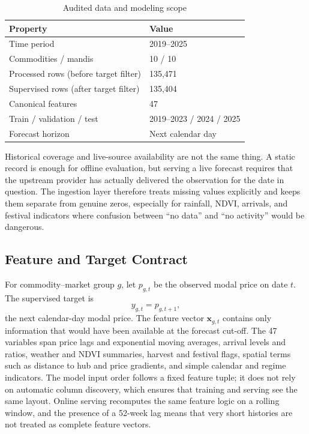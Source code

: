 \documentclass[a4paper,conference]{IEEEtran}
\begin{document}
\begin{table}[t]
\caption{Audited data and modeling scope}
\label{tab:data}
\centering
\small
\begin{tabular}{@{}ll@{}}
\toprule
Property & Value \\
\midrule
Time period & 2019--2025 \\
Commodities / mandis & 10 / 10 \\
Processed rows (before target filter) & 135{,}471 \\
Supervised rows (after target filter) & 135{,}404 \\
Canonical features & 47 \\
Train / validation / test & 2019--2023 / 2024 / 2025 \\
Forecast horizon & Next calendar day \\
\bottomrule
\end{tabular}
\end{table}

Historical coverage and live-source availability are not the same thing. A static record is enough for offline evaluation, but serving a live forecast requires that the upstream provider has actually delivered the observation for the date in question. The ingestion layer therefore treats missing values explicitly and keeps them separate from genuine zeros, especially for rainfall, NDVI, arrivals, and festival indicators where confusion between “no data” and “no activity” would be dangerous.

\subsection{Feature and Target Contract}
For commodity--market group $g$, let $p_{g,t}$ be the observed modal price on date $t$. The supervised target is
\begin{equation}
y_{g,t} = p_{g,t+1},
\label{eq:target}
\end{equation}
the next calendar-day modal price. The feature vector $\mathbf{x}_{g,t}$ contains only information that would have been available at the forecast cut-off. The 47 variables span price lags and exponential moving averages, arrival levels and ratios, weather and NDVI summaries, harvest and festival flags, spatial terms such as distance to hub and price gradients, and simple calendar and regime indicators. The model input order follows a fixed feature tuple; it does not rely on automatic column discovery, which ensures that training and serving see the same layout. Online serving recomputes the same feature logic on a rolling window, and the presence of a 52-week lag means that very short histories are not treated as complete feature vectors.
\end{document}

